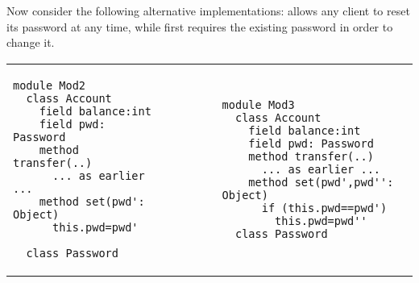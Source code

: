  

Now consider the following alternative implementations:
 allows any client to reset its password at any time, while
 first requires the existing password in order to change it.


  
%
  
  

\begin{tabular}{lll}
\begin{minipage}[b]{0.35\textwidth}
\begin{lstlisting}[language=chainmail, frame=lines]
module Mod2
  class Account
    field balance:int 
    field pwd: Password 
    method transfer(..) 
      ... as earlier ...
    method set(pwd': Object)
      this.pwd=pwd'
      
  class Password
\end{lstlisting}
\end{minipage}
&\ \ \  \ \   &%
\begin{minipage}[b]{0.50\textwidth}
\begin{lstlisting}[language=chainmail, frame=lines]
module Mod3
  class Account
    field balance:int 
    field pwd: Password 
    method transfer(..) 
      ... as earlier ...
    method set(pwd',pwd'': Object)
      if (this.pwd==pwd') 
        this.pwd=pwd''
  class Password
\end{lstlisting}
\end{minipage} 
\end{tabular}

